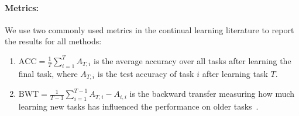 \paragraph{Metrics:} We use two commonly used metrics in the continual learning literature to report the results for all methods: 
\begin{enumerate}[topsep=0pt,noitemsep]
    \item $\text{ACC} = \frac{1}{T} \sum_{i=1}^{T} A_{T, i}$ is the average accuracy over all tasks after learning the final task, where $A_{T, i}$ is the test accuracy of task $i$ after learning task $T$. %
    \item $\text{BWT} = \frac{1}{T-1}\sum_{i=1}^{T-1} A_{T, i} - A_{i, i}$ is the backward transfer measuring how much learning new tasks has influenced the performance on older tasks~\citep{lopez2017gradient}.  %
\end{enumerate}





